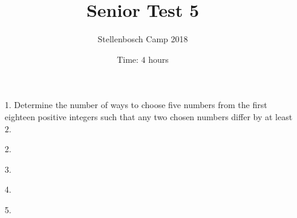 \documentclass[a4paper, 12pt]{article}
\title{Senior Test 5}
\author{Stellenbosch Camp 2018}
\date{Time: $4$ hours}
\begin{document}
 \maketitle

\begin{enumerate}

\item[1.] Determine the number of ways to choose five numbers from the first eighteen positive integers such that any two chosen numbers differ by at least $2$.


\vspace{6pt}

% 
\item[2.] 


\vspace{6pt}

% 
\item[3.] 


\vspace{6pt}

% 
\item[4.] 


\vspace{6pt}

% 
\item[5.] 


\end{enumerate}

\vfill

\centering
\begin{BVerbatim}
\end{BVerbatim}
\end{document}
